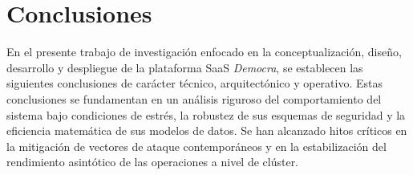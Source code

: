 \section{Conclusiones}
En el presente trabajo de investigación enfocado en la conceptualización, diseño, desarrollo y despliegue de la plataforma SaaS \textit{Democra}, se establecen las siguientes conclusiones de carácter técnico, arquitectónico y operativo. Estas conclusiones se fundamentan en un análisis riguroso del comportamiento del sistema bajo condiciones de estrés, la robustez de sus esquemas de seguridad y la eficiencia matemática de sus modelos de datos. Se han alcanzado hitos críticos en la mitigación de vectores de ataque contemporáneos y en la estabilización del rendimiento asintótico de las operaciones a nivel de clúster.


